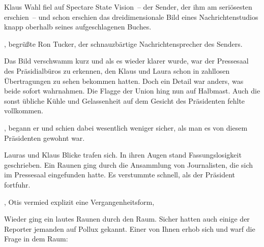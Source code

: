 \par

Klaus Wahl fiel auf Spectare State Vision~-- der Sender, der ihm am seriösesten erschien~-- und schon erschien das dreidimensionale Bild eines Nachrichtenstudios knapp oberhalb seines aufgeschlagenen Buches.

\par

, begrüßte Ron Tucker, der schnauzbärtige Nachrichtensprecher des Senders. 

\par

Das Bild verschwamm kurz und als es wieder klarer wurde, war der Pressesaal des Präsidialbüros zu erkennen, den Klaus und Laura schon in zahllosen Übertragungen zu sehen bekommen hatten. Doch ein Detail war anders, was beide sofort wahrnahmen. Die Flagge der Union hing nun auf Halbmast. Auch die sonst übliche Kühle und Gelassenheit auf dem Gesicht des Präsidenten fehlte vollkommen.

\par

, begann er und schien dabei wesentlich weniger sicher, als man es von diesem Präsidenten gewohnt war. 

\par

Lauras und Klaus Blicke trafen sich. In ihren Augen stand Fassungslosigkeit geschrieben. Ein Raunen ging durch die Ansammlung von Journalisten, die sich im Pressesaal eingefunden hatte. Es verstummte schnell, als der Präsident fortfuhr.

\par

, Otis vermied explizit eine Vergangenheitsform, 

\par

Wieder ging ein lautes Raunen durch den Raum. Sicher hatten auch einige der Reporter jemanden auf Pollux gekannt. Einer von Ihnen erhob sich und warf die Frage in dem Raum: 

